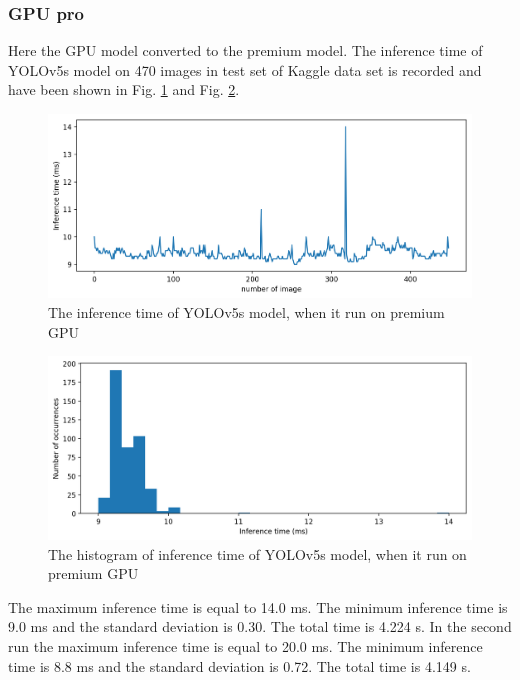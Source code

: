 \documentclass[12pt,a4paper]{article}
\begin{document}
\subsubsection*{GPU pro}
Here the GPU model converted to the premium model. The inference time of YOLOv5s model on 470 images in test set of Kaggle data set is recorded and have been shown in Fig. \ref{fig: gpupro} and Fig. \ref{fig: gpupro_hist}.
\begin{figure}[H]
    \centering
    \includegraphics[width=15cm]{figures/gpupro.png}
    \caption{The inference time of YOLOv5s model, when it run on premium GPU}
    \label{fig: gpupro}
\end{figure}
\begin{figure}[H]
    \centering
    \includegraphics[width=15cm]{figures/gpupro_hist.png}
    \caption{The histogram of inference time of YOLOv5s model, when it run on premium GPU}
    \label{fig: gpupro_hist}
\end{figure}
The maximum inference time is equal to 14.0 ms. The minimum inference time is 9.0 ms and the standard deviation is 0.30. The total time is 4.224 s. In the second run the maximum inference time is equal to 20.0 ms. The minimum inference time is 8.8 ms and the standard deviation is 0.72. The total time is 4.149 s.
\end{document}
